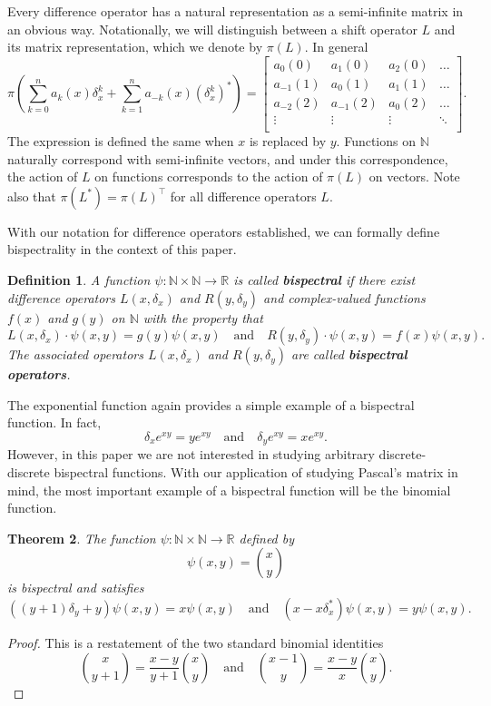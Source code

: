 \documentclass[11pt]{amsart}
\theoremstyle{plain}
\newtheorem{theorem}{Theorem}[section]
\newtheorem{definition}[theorem]{Definition}
\newcommand \bth[1] { \begin{theorem}\label{t#1} }
\newcommand \bde[1] { \begin{definition}\label{d#1}\rm }
\renewcommand {\eth} { \end{theorem} }
\newcommand {\ede} { \end{definition} }
\theoremstyle{named}
\newcommand{\vocab}[1]{\textbf{#1}}
\begin{document}
Every difference operator has a natural representation as a semi-infinite matrix in an obvious way.
Notationally, we will distinguish between a shift operator $L$ and its matrix representation, which we denote by $\pi(L)$.
In general
$$\pi\left(\sum_{k=0}^n a_k(x)\delta_x^k + \sum_{k=1}^n a_{-k}(x)(\delta_x^k)^*\right) =
\left[\begin{array}{cccc}
a_0(0) & a_1(0) & a_2(0) & \dots\\
a_{-1}(1) & a_0(1) & a_1(1) & \dots\\
a_{-2}(2) & a_{-1}(2) & a_0(2) & \dots\\
\vdots & \vdots & \vdots & \ddots\\
\end{array}\right].$$
The expression is defined the same when $x$ is replaced by $y$.
Functions on $\mathbb{N}$ naturally correspond with semi-infinite vectors, and under this correspondence, the action of $L$ on functions corresponds to the action of $\pi(L)$ on vectors.
Note also that $\pi(L^*) = \pi(L)^\intercal$ for all difference operators $L$.

With our notation for difference operators established, we can formally define bispectrality in the context of this paper.
\bde{def:bispectrality}
A function $\psi: \mathbb{N}\times\mathbb{N}\rightarrow\mathbb{R}$ is called \vocab{bispectral} if there exist difference operators $L(x,\delta_x)$ and $R(y,\delta_y)$ and complex-valued functions $f(x)$ and $g(y)$ on $\mathbb{N}$ with the property that
$$L(x,\delta_x)\cdot \psi(x,y) = g(y)\psi(x,y)\quad\text{and}\quad R(y,\delta_y)\cdot\psi(x,y) = f(x)\psi(x,y).$$
The associated operators $L(x,\delta_x)$ and $R(y,\delta_y)$ are called \vocab{bispectral operators}.
\ede

The exponential function again provides a simple example of a bispectral function.
In fact,
$$\delta_x e^{xy} = ye^{xy}\quad\text{and}\quad\delta_y e^{xy} = xe^{xy}.$$
However, in this paper we are not interested in studying arbitrary discrete-discrete bispectral functions.
With our application of studying Pascal's matrix in mind, the most important example of a bispectral function will be the binomial function.

\bth{thm:bispectral}
The function $\psi: \mathbb{N}\times\mathbb{N}\rightarrow \mathbb{R}$ defined by
$$\psi(x,y) = \binom{x}{y}$$
is bispectral and satisfies
$$((y+1)\delta_y+y)\psi(x,y)=x\psi(x,y)\quad\text{and}\quad(x-x\delta^*_x)\psi(x,y) = y\psi(x,y).$$
\eth
\begin{proof}
This is a restatement of the two standard binomial identities
$$\binom{x}{y+1} = \frac{x-y}{y+1}\binom{x}{y}\quad\text{and}\quad\binom{x-1}{y} = \frac{x-y}{x}\binom{x}{y}.$$
\end{proof}
\end{document}
